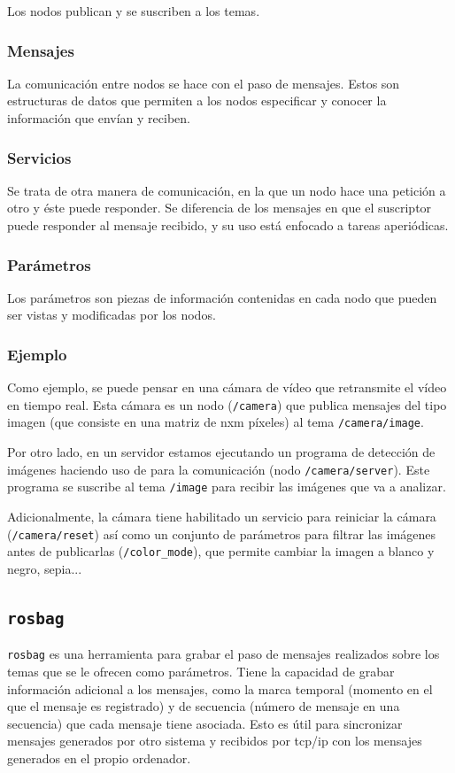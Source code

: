 Los nodos publican y se suscriben a los temas.

\subsubsection{Mensajes}
La comunicación entre nodos se hace con el paso de mensajes. Estos son estructuras de datos que permiten a los nodos especificar y conocer la información que envían y reciben.

\subsubsection{Servicios}
Se trata de otra manera de comunicación, en la que un nodo hace una petición a otro y éste puede responder. Se diferencia de los mensajes en que el suscriptor puede responder al mensaje recibido, y su uso está enfocado a tareas aperiódicas.

\subsubsection{Parámetros}
Los parámetros son piezas de información contenidas en cada nodo que pueden ser vistas y modificadas por los nodos.

\subsubsection{Ejemplo}
Como ejemplo, se puede pensar en una cámara de vídeo que retransmite el vídeo en tiempo real. Esta cámara es un nodo (\texttt{/camera}) que publica mensajes del tipo imagen (que consiste en una matriz de nxm píxeles) al tema \texttt{/camera/image}.

Por otro lado, en un servidor estamos ejecutando un programa de detección de imágenes haciendo uso de \ros para la comunicación (nodo \texttt{/camera/server}). Este programa se suscribe al tema \texttt{/image} para recibir las imágenes que va a analizar.

Adicionalmente, la cámara tiene habilitado un servicio para reiniciar la cámara (\texttt{/camera/reset}) así como un conjunto de parámetros para filtrar las imágenes antes de publicarlas (\texttt{/color\_mode}), que permite cambiar la imagen a blanco y negro, sepia...

\subsection{\texttt{rosbag}}
\label{subsec:metodos/rosbag}
\texttt{rosbag} \cite{rosbag} es una herramienta para grabar el paso de mensajes realizados sobre los temas que se le ofrecen como parámetros. Tiene la capacidad de grabar información adicional a los mensajes, como la marca temporal (momento en el que el mensaje es registrado) y de secuencia (número de mensaje en una secuencia) que cada mensaje tiene asociada. Esto es útil para sincronizar mensajes generados por otro sistema y recibidos por tcp/ip con los mensajes generados en el propio ordenador.


